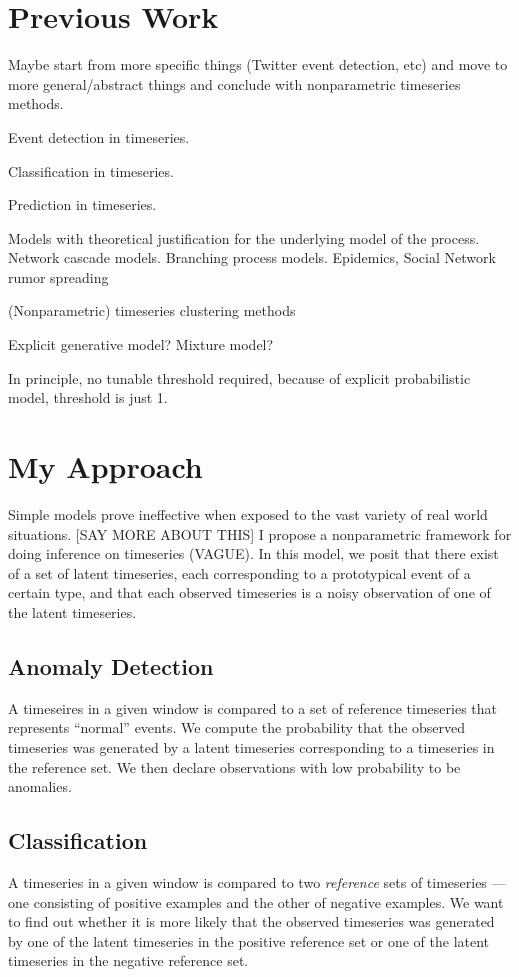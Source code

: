 \section{Previous Work}
Maybe start from more specific things (Twitter event detection, etc) and move to more general/abstract things and conclude with nonparametric timeseries methods.

Event detection in timeseries.

Classification in timeseries.

Prediction in timeseries.

Models with theoretical justification for the underlying model of the process. Network cascade models. Branching process models.
Epidemics, Social Network rumor spreading

(Nonparametric) timeseries clustering methods

Explicit generative model? Mixture model?

In principle, no tunable threshold required, because of explicit probabilistic model, threshold is just 1.

\section{My Approach}
Simple models prove ineffective when exposed to the vast variety of real world situations. [SAY MORE ABOUT THIS] I propose a nonparametric framework for doing inference on timeseries (VAGUE). In this model, we posit that there exist of a set of latent timeseries, each corresponding to a prototypical event of a certain type, and that each observed timeseries is a noisy observation of one of the latent timeseries.

\subsection{Anomaly Detection}
A timeseires in a given window is compared to a set of reference timeseries that represents ``normal'' events. We compute the probability that the observed timeseries was generated by a latent timeseries corresponding to a timeseries in the reference set. We then declare observations with low probability to be anomalies.

\subsection{Classification}
A timeseries in a given window is compared to two {\em reference} sets of timeseries --- one consisting of positive examples and the other of negative examples. We want to find out whether it is more likely that the observed timeseries was generated by one of the latent timeseries in the positive reference set or one of the latent timeseries in the negative reference set.

